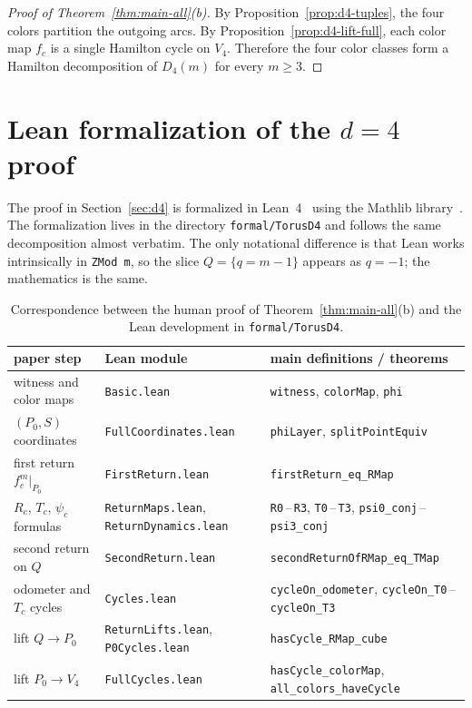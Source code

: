 \documentclass[11pt]{article}
\newcommand{\Pzero}{P_0}
\newcommand{\Qslice}{Q}
\begin{document}
\begin{proof}[Proof of Theorem~\ref{thm:main-all}\textup{(b)}]
By Proposition~\ref{prop:d4-tuples}, the four colors partition the outgoing arcs.
By Proposition~\ref{prop:d4-lift-full}, each color map $f_c$ is a single Hamilton cycle on $V_4$.
Therefore the four color classes form a Hamilton decomposition of $D_4(m)$ for every $m\ge 3$.
\end{proof}


\section{Lean formalization of the \texorpdfstring{$d=4$}{d=4} proof}\label{sec:d4-lean}

The proof in Section~\ref{sec:d4} is formalized in Lean~4~\cite{Lean4} using the Mathlib library~\cite{Mathlib}.
The formalization lives in the directory \texttt{formal/TorusD4} and follows the same decomposition almost verbatim.
The only notational difference is that Lean works intrinsically in \texttt{ZMod m}, so the slice $\Qslice=\{q=m-1\}$ appears as $q=-1$; the mathematics is the same.

\begin{table}[t]
\centering
\scriptsize
\setlength{\tabcolsep}{4pt}
\begin{tabularx}{\textwidth}{@{}l>{\raggedright\arraybackslash}X>{\raggedright\arraybackslash}X@{}}
\toprule
paper step & Lean module & main definitions / theorems \\
\midrule
witness and color maps & \texttt{Basic.lean} & \texttt{witness}, \texttt{colorMap}, \texttt{phi} \\
$(\Pzero,S)$ coordinates & \texttt{FullCoordinates.lean} & \texttt{phiLayer}, \texttt{splitPointEquiv} \\
first return $f_c^m|_{\Pzero}$ & \texttt{FirstReturn.lean} & \texttt{firstReturn\_eq\_RMap} \\
$R_c$, $T_c$, $\psi_c$ formulas & \texttt{ReturnMaps.lean}, \texttt{ReturnDynamics.lean} & \texttt{R0}\,--\,\texttt{R3}, \texttt{T0}\,--\,\texttt{T3}, \texttt{psi0\_conj}\,--\,\texttt{psi3\_conj} \\
second return on $\Qslice$ & \texttt{SecondReturn.lean} & \texttt{secondReturnOfRMap\_eq\_TMap} \\
odometer and $T_c$ cycles & \texttt{Cycles.lean} & \texttt{cycleOn\_odometer}, \texttt{cycleOn\_T0}\,--\,\texttt{cycleOn\_T3} \\
lift $\Qslice\to\Pzero$ & \texttt{ReturnLifts.lean}, \texttt{P0Cycles.lean} & \texttt{hasCycle\_RMap\_cube} \\
lift $\Pzero\to V_4$ & \texttt{FullCycles.lean} & \texttt{hasCycle\_colorMap}, \texttt{all\_colors\_haveCycle} \\
\bottomrule
\end{tabularx}
\caption{Correspondence between the human proof of Theorem~\ref{thm:main-all}(b) and the Lean development in \texttt{formal/TorusD4}.}
\label{tab:d4-lean-map}
\end{table}
\end{document}
